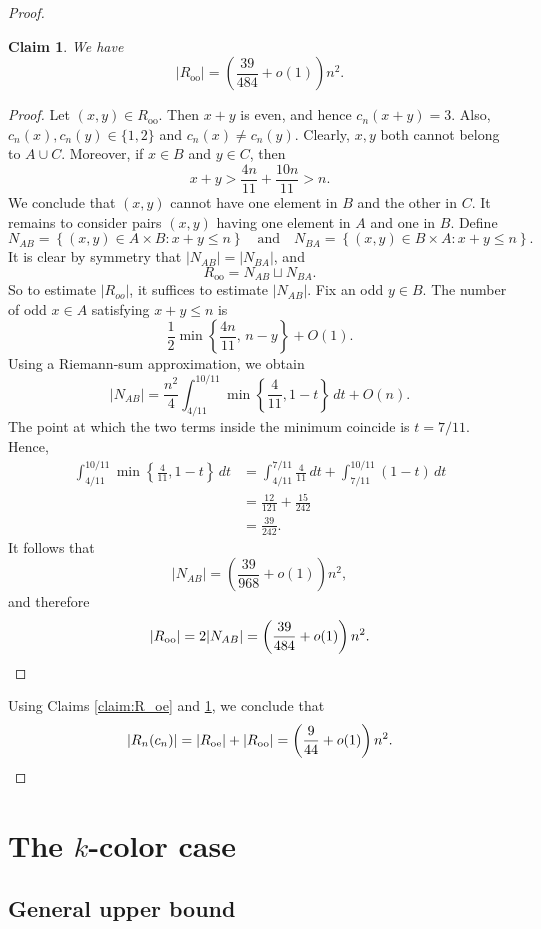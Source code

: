 \documentclass[11pt]{article}
\theoremstyle{plain}
\newtheorem{claim}{Claim}[section]
\numberwithin{equation}{section}
\begin{document}
\begin{proof}
\begin{claim}\label{claim:R_oo} We have 
\[|R_{\mathrm{oo}}| = \left(\frac{39}{484}+o(1)\right)n^2.\]
\end{claim}

\begin{proof} Let $(x,y)\in R_{\mathrm{oo}}$. Then $x+y$ is even, and hence $c_n(x+y) = 3$. Also, $c_n(x), c_n(y)\in \{1,2\}$ and $c_n(x)\neq c_n(y)$. Clearly, $x,y$ both cannot belong to $A\cup C$. Moreover, if $x\in B$ and $y\in C$, then
\[
x+y>
\frac{4n}{11}+\frac{10n}{11}>n.
\]
We conclude that $(x,y)$ cannot have one element in $B$ and the other in $C$. It remains to consider pairs $(x,y)$ having one element in $A$ and one in $B$. Define
\[
N_{AB}
=
\left\{(x,y)\in A\times B:x+y\leq n\right\} \quad \text{and}\quad N_{BA}
=
\left\{(x,y)\in B\times A:x+y\leq n\right\}.
\]
It is clear by symmetry that $|N_{AB}| = |N_{BA}|$, and
\[R_{\mathrm{oo}} = N_{AB}\sqcup N_{BA}.\]
So to estimate $|R_{oo}|$, it suffices to estimate $|N_{AB}|$. Fix an odd $y\in B$. The number of odd $x\in A$ satisfying
$x+y\leq n$ is
\[
\frac12
\min\left\{\frac{4n}{11},\,n-y\right\}+O(1).
\]
Using a Riemann-sum approximation, we obtain
\[
|N_{AB}|
=
\frac{n^2}{4}
\int_{4/11}^{10/11}
\min\left\{\frac{4}{11},1-t\right\}\,dt
+O(n).
\]
The point at which the two terms inside the minimum coincide is
$t=7/11$. Hence,
\[
\begin{aligned}
\int_{4/11}^{10/11}
\min\left\{\frac{4}{11},1-t\right\}\,dt
&=
\int_{4/11}^{7/11}\frac{4}{11}\,dt
+
\int_{7/11}^{10/11}(1-t)\,dt\\
&=
\frac{12}{121}+\frac{15}{242}\\
&=
\frac{39}{242}.
\end{aligned}
\]
It follows that
\[
|N_{AB}|
=
\left(\frac{39}{968}+o(1)\right)n^2,
\]
and therefore
\[
|R_{\mathrm{oo}}|
=
2|N_{AB}|
=
\left(\frac{39}{484}+o(1)\right)n^2.\qedhere
\]
\end{proof}
Using Claims \ref{claim:R_oe} and \ref{claim:R_oo}, we conclude that
\[    |R_n(c_n)| = |R_{\mathrm{oe}}|+|R_{\mathrm{oo}}| = \left(\frac{9}{44}+o(1)\right)n^2.\qedhere\]
\end{proof}


\section{The $k$-color case}

\subsection{General upper bound}
\end{document}
